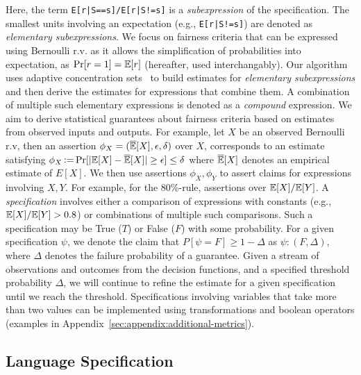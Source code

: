 Here, the term \lstinline{E[r|S==s]/E[r|S!=s]} is a \textit{subexpression} of the specification.
The smallest units involving an expectation (e.g., \lstinline{E[r|S!=s]}) are denoted as \textit{elementary subexpressions}.
We focus on fairness criteria that can be expressed using Bernoulli r.v. as it allows the simplification of probabilities into expectation, as $\Pr[r = 1] = \mathbb{E}[r]$ (hereafter, used interchangably).
Our algorithm uses adaptive concentration sets~\citep{zhao2016adaptive,howard2021time} to build estimates for \textit{elementary subexpressions} and then derive the estimates for expressions that combine them.
A combination of multiple such elementary expressions is denoted as a \textit{compound} expression.
We aim to derive statistical guarantees about fairness criteria based on estimates from observed inputs and outputs.
For example, let $X$ be an observed Bernoulli r.v, then an assertion $\phi_X = (\overline{\mathbb{E}}[X], \epsilon, \delta)$ over $X$, corresponds to an estimate satisfying $\phi_X \operatorname{\vcentcolon=} \Pr[|\mathbb{E}[X] - \overline{\mathbb{E}}[X]| \geq \epsilon] \leq \delta $
where $\overline{\mathbb{E}}[X]$ denotes an empirical estimate of $E[X]$.
We then use assertions $\phi_X, \phi_Y$ to assert claims for expressions involving $X, Y$.
For example, for the 80\%-rule, assertions over $\mathbb{E}[X]/\mathbb{E}[Y]$.
A \textit{specification} involves either a comparison of expressions with constants (e.g., $\mathbb{E}[X]/\mathbb{E}[Y] > 0.8$) or combinations of multiple such comparisons. 
Such a specification may be True ($T$) or False ($F$) with some probability.
For a given specification $\psi$, we denote the claim that $P[\psi = F] \geq 1 - \Delta$ as $\psi: (F, \Delta)$, where $\Delta$ denotes the failure probability of a guarantee. 
Given a stream of observations and outcomes from the decision functions, and a specified threshold probability $\Delta$, we will continue to refine the estimate for a given specification until we reach the threshold.
Specifications involving variables that take more than two values can be implemented using transformations and boolean operators (examples in Appendix~\ref{sec:appendix:additional-metrics}).

\subsection{Language Specification}
\label{sec:theoretical:specification}


